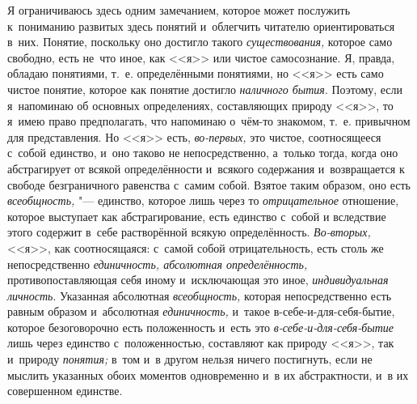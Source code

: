 Я ограничиваюсь здесь одним замечанием, которое может послужить к~пониманию
развитых здесь понятий и~облегчить читателю ориентироваться в~них. Понятие,
поскольку оно достигло такого {\em существования,} которое само свободно,
есть не~что иное, как <<я>> или чистое самосознание. Я, правда, обладаю
понятиями, т.~е. определёнными понятиями, но <<я>> есть само чистое понятие,
которое как понятие достигло {\em наличного бытия}. Поэтому, если я~напоминаю
об основных определениях, составляющих природу <<я>>, то я~имею право
предполагать, что напоминаю о~чём-то знакомом, т.~е. привычном для
представления. Но <<я>> есть, {\em во-первых,} это чистое, соотносящееся с~собой
единство, и~оно таково не непосредственно, а~только тогда, когда оно
абстрагирует от всякой определённости и~всякого содержания и~возвращается к
свободе безграничного равенства с~самим собой. Взятое таким образом, оно
есть {\em всеобщность,} "--- единство, которое лишь через то {\em отрицательное}
отношение, которое выступает как абстрагирование, есть единство с~собой и
вследствие этого содержит в~себе растворённой всякую определённость.
{\em Во-вторых,} <<я>>, как соотносящаяся: с~самой собой отрицательность, есть
столь же непосредственно {\em единичность, абсолютная определённость,}
противопоставляющая себя иному и~исключающая это иное, {\em индивидуальная
личность}. Указанная абсолютная {\em всеобщность,} которая непосредственно есть
равным образом и~абсолютная {\em единичность,} и~такое в-себе-и-для-себя-бытие,
которое безоговорочно есть положенность и~есть это
{\em в-себе-и-для-себя-бытие} лишь через единство с~положенностью, составляют
как природу <<я>>, так и~природу {\em понятия;} в~том и~в другом нельзя ничего
постигнуть, если не мыслить указанных обоих моментов одновременно и~в их
абстрактности, и~в их совершенном единстве.

